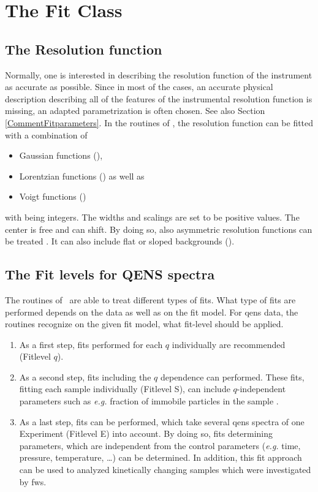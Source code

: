 \section{The Fit Class}
\label{FIT}
\subsection{The Resolution function}
\label{FIT:VANADIUM}
Normally, one is interested in describing the resolution function of the instrument as accurate as possible. Since in most of the cases, an accurate physical description describing all of the features of the instrumental resolution function is missing, an adapted parametrization is often chosen. See also Section \ref{CommentFitparameters}. 
In the routines of \PyQENS, the resolution function can be fitted with a combination of 
\begin{itemize}
	\item Gaussian functions (),
	\item Lorentzian functions () as well as
	\item Voigt functions ()
\end{itemize} with  being integers. The widths and scalings are set to be positive values. The center is free and can shift. By doing so, also asymmetric resolution functions can be treated \cite{Grimaldo_2015_JPhysChemLett}. 
It can also include flat or sloped backgrounds ().
\subsection{The Fit levels for QENS spectra}
\label{FIT:LEVEL} The routines of \PyQENS\, are able to treat different types of fits. What type of fits are performed depends on the data as well as on the fit model. 
For \gls{qens} data, the routines recognize on the given fit model, what fit-level should be applied. 
\begin{enumerate}
	\item As a first step, fits performed for each $q$ individually are recommended (Fitlevel $q$).
	\item As a second step, fits including the $q$ dependence can performed. These fits, fitting each sample individually (Fitlevel S), can include $q$-independent parameters such as \textit{e.g.} fraction of immobile particles in the sample \cite{Beck_2019_CrystGrowthDes}.
	\item As a last step, fits can be performed, which take several \gls{qens} spectra of one Experiment (Fitlevel E)  into account. By doing so, fits determining parameters, which are independent from the control parameters (\textit{e.g.} time, pressure, temperature, \dots) can be determined. In addition, this fit approach can be used to analyzed kinetically changing samples which were investigated by \gls{fws}.
\end{enumerate}
